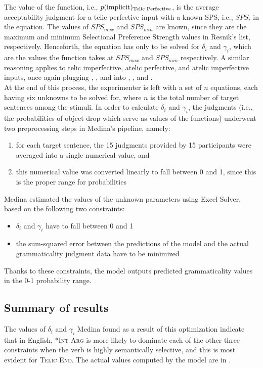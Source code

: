 The value of the function, i.e., $p(\text{implicit})\textsubscript{Telic Perfective}$, is the average acceptability judgment for a telic perfective input with a known SPS, i.e., $SPS_{i}$ in the equation. The values of $SPS_{max}$ and $SPS_{min}$ are known, since they are the maximum and minimum Selectional Preference Strength values in Resnik's list, respectively. Henceforth, the equation has only to be solved for $\delta_i$ and $\gamma_i$, which are the values the function takes at $SPS_{max}$ and $SPS_{min}$ respectively. A similar reasoning applies to telic imperfective, atelic perfective, and atelic imperfective inputs, once again plugging , , and  into , , and .\\
At the end of this process, the experimenter is left with a set of $n$ equations, each having six unknowns to be solved for, where $n$ is the total number of target sentences among the stimuli. In order to calculate $\delta_i$ and $\gamma_i$, the judgments (i.e., the probabilities of object drop which serve as values of the functions) underwent two preprocessing steps in Medina's pipeline, namely:
\begin{enumerate}
    \item for each target sentence, the 15 judgments provided by 15 participants were averaged into a single numerical value, and
    \item this numerical value was converted linearly to fall between 0 and 1, since this is the proper range for probabilities
\end{enumerate}

Medina estimated the values of the unknown parameters using Excel Solver, based on the following two constraints: 
\begin{itemize}
    \item $\delta_i$ and $\gamma_i$ have to fall between 0 and 1
    \item the sum-squared error between the predictions of the model and the actual grammaticality judgment data have to be minimized
\end{itemize}
Thanks to these constraints, the model outputs predicted grammaticality values in the 0-1 probability range.

\subsection{Summary of results} The values of $\delta_i$ and $\gamma_i$ Medina found as a result of this optimization indicate that in English, \textsc{*Int Arg} is more likely to dominate each of the other three constraints when the verb is highly semantically selective, and this is most evident for \textsc{Telic End}. The actual values computed by the model are in .

